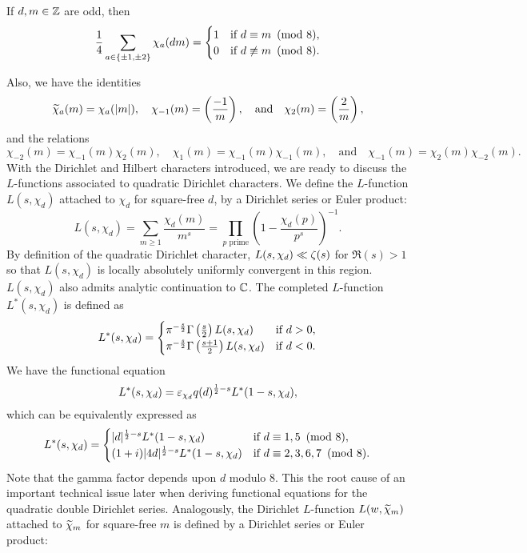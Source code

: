     \begin{theorem}
        If $d,m \in \mathbb{Z}$ are odd, then
        \[
            \frac{1}{4}\sum_{a \in \{\pm1,\pm2\}}\chi_{a}(dm) = \begin{cases} 1 & \text{if $d \equiv m \ \left(\text{mod }8\right)$}, \\ 0 & \text{if $d \not\equiv m \ \left(\text{mod }8\right)$}. \end{cases}
        \]
    \end{theorem}

    Also, we have the identities
    \[
        \widetilde{\chi}_{a}(m) = \chi_{a}(|m|), \quad \chi_{-1}(m) = \left(\frac{-1}{m}\right), \quad \text{and} \quad \chi_{2}(m) = \left(\frac{2}{m}\right),
    \]
    and the relations
    \[
        \chi_{-2}(m) = \chi_{-1}(m)\chi_{2}(m), \quad \chi_{1}(m) = \chi_{-1}(m)\chi_{-1}(m), \quad \text{and} \quad \chi_{-1}(m) = \chi_{2}(m)\chi_{-2}(m).
    \]
    With the Dirichlet and Hilbert characters introduced, we are ready to discuss the $L$-functions associated to quadratic Dirichlet characters. We define the $L$-function $L(s,\chi_{d})$ attached to $\chi_{d}$ for square-free $d$, by a Dirichlet series or Euler product:
    \[
        L(s,\chi_{d}) = \sum_{m \ge 1}\frac{\chi_{d}(m)}{m^{s}} = \prod_{p \text{ prime}}\left(1-\frac{\chi_{d}(p)}{p^{s}}\right)^{-1}.
    \]
    By definition of the quadratic Dirichlet character, $L(s,\chi_{d}) \ll \zeta(s)$ for $\Re(s) > 1$ so that $L(s,\chi_{d})$ is locally absolutely uniformly convergent in this region. $L(s,\chi_{d})$ also admits analytic continuation to $\mathbb{C}$. The completed $L$-function $L^{\ast}(s,\chi_{d})$ is defined as
    \[
        L^{\ast}(s,\chi_{d}) = \begin{cases} \pi^{-\frac{s}{2}}\Gamma\left(\frac{s}{2}\right)L(s,\chi_{d}) & \text{if $d > 0$}, \\ \pi^{-\frac{s}{2}}\Gamma\left(\frac{s+1}{2}\right)L(s,\chi_{d}) & \text{if $d < 0$}. \end{cases}
    \]
    We have the functional equation
    \[
        L^{\ast}(s,\chi_{d}) = \varepsilon_{\chi_{d}}q(d)^{\frac{1}{2}-s}L^{\ast}(1-s,\chi_{d}),
    \]
    which can be equivalently expressed as
    \[
        L^{\ast}(s,\chi_{d}) = \begin{cases} |d|^{\frac{1}{2}-s}L^{\ast}(1-s,\chi_{d}) & \text{if $d \equiv 1,5 \ \left(\text{mod }8\right)$}, \\ (1+i)|4d|^{\frac{1}{2}-s}L^{\ast}(1-s,\chi_{d}) & \text{if $d \equiv 2,3,6,7 \ \left(\text{mod }8\right)$}. \end{cases}
    \]
    Note that the gamma factor depends upon $d$ modulo $8$. This the root cause of an important technical issue later when deriving functional equations for the quadratic double Dirichlet series. Analogously, the Dirichlet $L$-function $L(w,\widetilde{\chi}_{m})$ attached to $\widetilde{\chi}_{m}$ for square-free $m$ is defined by a Dirichlet series or Euler product:
